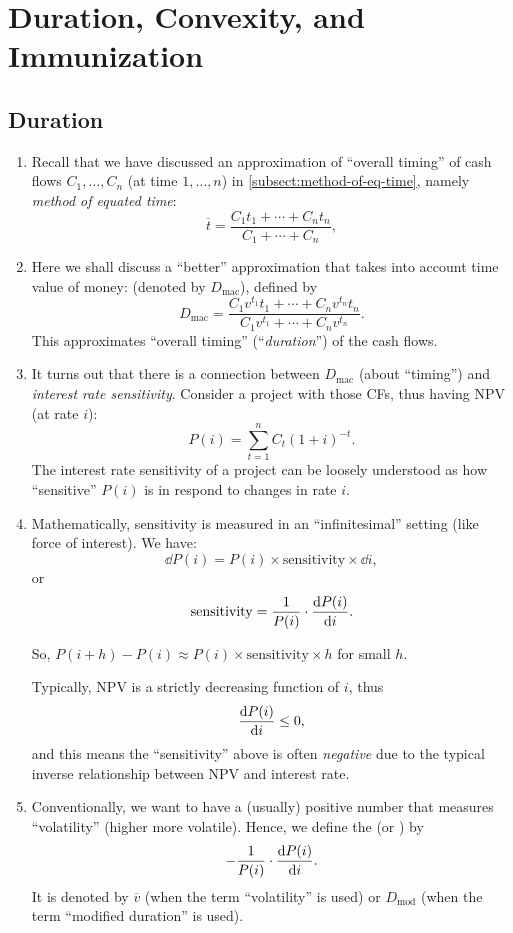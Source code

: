 \section{Duration, Convexity, and Immunization}
\label{sect:duration-convexity-immun}
\subsection{Duration}
\begin{enumerate}
\item Recall that we have discussed an approximation of ``overall timing'' of
cash flows \(C_1,\dotsc,C_n\) (at time \(1,\dotsc,n\)) in
\cref{subsect:method-of-eq-time}, namely \emph{method of equated time}:
\[
\overline{t}=\frac{C_1t_1+\dotsb+C_nt_n}{C_1+\dotsb+C_n},
\]
\item Here we shall discuss a ``better'' approximation that takes into account
time value of money:  (denoted by \(D_{\text{mac}}\)),
defined by
\[
D_{\text{mac}}=\frac{C_1v^{t_1}t_1+\dotsb+C_nv^{t_n}t_n}{C_1v^{t_1}+\dotsb+C_nv^{t_n}}.
\]
This approximates ``overall timing'' (``\emph{duration}'') of the cash flows.

\item It turns out that there is a connection between \(D_{\text{mac}}\) (about
``timing'') and \emph{interest rate sensitivity}. Consider a project with those
CFs, thus having NPV (at rate \(i\)):
\[
P(i)=\sum_{t=1}^{n}C_t(1+i)^{-t}.
\]
The interest rate sensitivity of a project can be loosely understood as how
``sensitive'' \(P(i)\) is in respond to changes in rate \(i\).
\item Mathematically, sensitivity is measured in an ``infinitesimal'' setting
(like force of interest). We have:
\[
\dd{P(i)}=P(i)\times\text{sensitivity}\times \dd{i},
\]
or
\[
\text{sensitivity}=\frac{1}{P(i)}\cdot\dv{P(i)}{i}.
\]
\begin{note}
So, \(P(i+h)-P(i)\approx P(i)\times\text{sensitivity}\times h\) for small \(h\).
\end{note}
Typically, NPV is a strictly decreasing function of \(i\), thus
\[
\dv{P(i)}{i}\le 0,
\]
and this means the ``sensitivity'' above is often \emph{negative} due to
the typical inverse relationship between NPV and interest rate.

\item Conventionally, we want to have a (usually) positive number that measures
``volatility'' (higher  more volatile). Hence, we define
the  (or ) by
\[
-\frac{1}{P(i)}\cdot\dv{P(i)}{i}.
\]
It is denoted by \(\overline{v}\) (when the term ``volatility'' is used) or
\(D_{\text{mod}}\) (when the term ``modified duration'' is used).


\end{enumerate}
